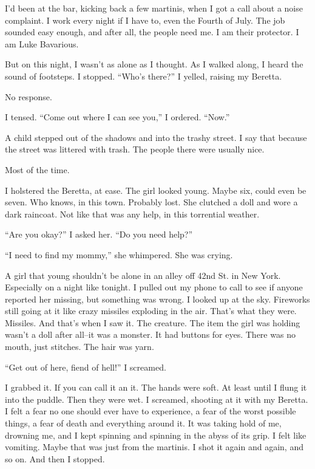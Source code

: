 I'd been at the bar, kicking back a few martinis, when I got a call
about a noise complaint. I work every night if I have to, even the
Fourth of July. The job sounded easy enough, and after all, the
people need me. I am their protector. I am Luke Bavarious.



But on this night, I wasn't as alone as I thought. As I walked
along, I heard the sound of footsteps. I stopped. ``Who's there?'' I
yelled, raising my Beretta.



No response.



I tensed. ``Come out where I can see you,'' I ordered. ``Now.''



A child stepped out of the shadows and into the trashy street. I
say that because the street was littered with trash. The people
there were usually nice.



Most of the time.



I holstered the Beretta, at ease. The girl looked young. Maybe six,
could even be seven. Who knows, in this town. Probably lost. She
clutched a doll and wore a dark raincoat. Not like that was any
help, in this torrential weather.



``Are you okay?'' I asked her. ``Do you need help?''



``I need to find my mommy,'' she whimpered. She was crying.



A girl that young shouldn't be alone in an alley off 42nd St. in
New York. Especially on a night like tonight. I pulled out my phone
to call to see if anyone reported her missing, but something was
wrong. I looked up at the sky. Fireworks still going at it like
crazy missiles exploding in the air. That's what they were.
Missiles. And that's when I saw it. The creature. The item the girl
was holding wasn't a doll after all--it was a monster. It had
buttons for eyes. There was no mouth, just stitches. The hair was
yarn.



``Get out of here, fiend of hell!'' I screamed.



I grabbed it. If you can call it an it. The hands were soft. At
least until I flung it into the puddle. Then they were wet. I
screamed, shooting at it with my Beretta. I felt a fear no one
should ever have to experience, a fear of the worst possible
things, a fear of death and everything around it. It was taking
hold of me, drowning me, and I kept spinning and spinning in the
abyss of its grip. I felt like vomiting. Maybe that was just from
the martinis. I shot it again and again, and so on. And then I
stopped.



